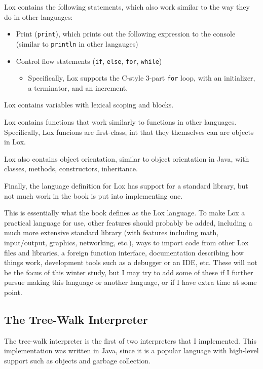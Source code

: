 \documentclass[tikz]{article}
\renewcommand{\:}{\colon}
\begin{document}
Lox contains the following statements, which also work similar to the way they do in other languages:
\begin{itemize}
  \item Print (\texttt{print}), which prints out the following expression to the console (similar to \texttt{println} in other langauges)
  \item Control flow statements (\texttt{if}, \texttt{else}, \texttt{for}, \texttt{while})
  \begin{itemize}
    \item Specifically, Lox supports the C-style 3-part \texttt{for} loop, with an initializer, a terminator, and an increment.
  \end{itemize}
\end{itemize}

Lox contains variables with lexical scoping and blocks.

Lox contains functions that work similarly to functions in other languages. Specifically, Lox funcions are first-class, int that they themselves can are objects in Lox.

Lox also contains object orientation, similar to object orientation in Java, with classes, methods, constructors, inheritance.

Finally, the language definition for Lox has support for a standard library, but not much work in the book is put into implementing one.

This is essentially what the book defines as the Lox language. To make Lox a practical language for use, other features should probably be added, including a much more extensive standard library (with features including math, input/output, graphics, networking, etc.), ways to import code from other Lox files and libraries, a foreign function interface, documentation describing how things work, development tools such as a debugger or an IDE, etc. These will not be the focus of this winter study, but I may try to add some of these if I further pursue making this language or another language, or if I have extra time at some point.

\subsection*{The Tree-Walk Interpreter}
The tree-walk interpreter is the first of two interpreters that I implemented. This implementation was written in Java, since it is a popular language with high-level support such as objects and garbage collection.
\end{document}
